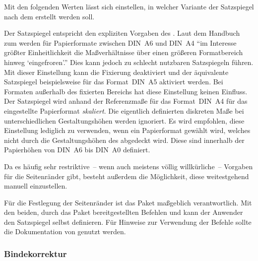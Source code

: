 \begin{DeclareEntity*}{}
\begin{DeclareEntity*}{}
\begin{DeclareEntity*}{}
\begin{Declaration}
%
Mit den folgenden Werten lässt sich einstellen, in welcher Variante der 
Satzspiegel nach dem \TUDCD erstellt werden soll.
\begin{DeclareValues}
  Der Satzspiegel entspricht den expliziten Vorgaben des \CDs.
  Laut dem Handbuch zum \CD werden für Papierformate zwischen DIN~A6 und DIN~A4 
  \enquote{im Interesse größter Einheitlichkeit die Maßverhältnisse über einen 
  größeren Formatbereich hinweg \enquote{eingefroren}.} Dies kann jedoch zu 
  schlecht nutzbaren Satzspiegeln führen. Mit dieser Einstellung kann die 
  Fixierung deaktiviert und der äquivalente Satzspiegel beispielsweise für das 
  Format~DIN~A5 aktiviert werden. Bei Formaten außerhalb des fixierten Bereichs 
  hat diese Einstellung keinen Einfluss. 
  Der Satzspiegel wird anhand der Referenzmaße für das Format~DIN~A4 für das 
  eingestellte Papierformat \emph{skaliert}. Die eigentlich definierten 
  diskreten Maße bei unterschiedlichen Gestaltungshöhen werden ignoriert. Es 
  wird empfohlen, diese Einstellung lediglich zu verwenden, wenn ein 
  Papierformat gewählt wird, welches nicht durch die Gestaltungshöhen des 
  \TUDCDs abgedeckt wird. Diese sind innerhalb der Papierhöhen von DIN~A6 bis 
  DIN~A0 definiert.
\end{DeclareValues}

%
Da es häufig sehr restriktive~-- wenn auch meistens völlig willkürliche~-- 
Vorgaben für die Seitenränder gibt, besteht außerdem die Möglichkeit, diese 
weitestgehend manuell einzustellen. 
\begin{DeclareValues}
  Für die Festlegung der Seitenränder ist das Paket  
  maßgeblich verantwortlich. Mit den beiden, durch das Paket bereitgestellten 
  Befehlen  und 
   kann der Anwender 
  den Satzspiegel selbst definieren. Für Hinweise zur Verwendung der Befehle 
  sollte die Dokumentation von  genutzt werden.
\end{DeclareValues}
\end{Declaration}



\subsubsection{%
  Bindekorrektur%
}


\end{DeclareEntity*}
\end{DeclareEntity*}
\end{DeclareEntity*}

